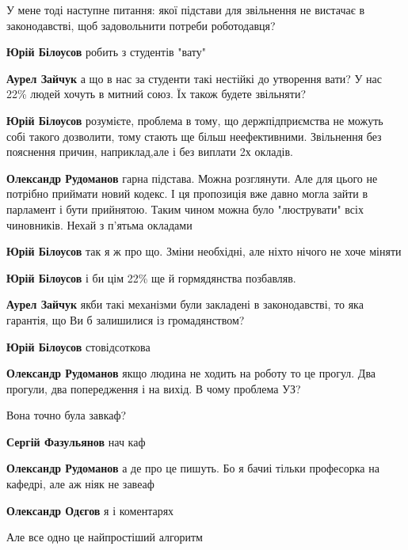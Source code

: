 \begin{itemize}
\begin{itemize}
У мене тоді наступне питання: якої підстави для звільнення не вистачає в
законодавстві, щоб задовольнити потреби роботодавця?

\textbf{Юрій Білоусов} робить з студентів "вату"

\textbf{Аурел Зайчук} а що в нас за студенти такі нестійкі до утворення вати? У нас 22\% людей хочуть в митний союз. Їх також будете звільняти?


\textbf{Юрій Білоусов} розумієте, проблема в тому, що держпідприємства не можуть собі такого дозволити, тому стають ще більш неефективними.
Звільнення без пояснення причин, наприклад,але і без виплати 2х окладів.

\textbf{Олександр Рудоманов} гарна підстава. Можна розглянути. Але для цього не потрібно приймати новий кодекс. І ця пропозиція вже давно могла зайти в парламент і бути прийнятою. Таким чином можна було "люструвати" всіх чиновників. Нехай з п'ятьма окладами


\textbf{Юрій Білоусов} так я ж про що. Зміни необхідні, але ніхто нічого не хоче міняти

\textbf{Юрій Білоусов} і би цім 22\% ще й гормядянства позбавляв.

\textbf{Аурел Зайчук} якби такі механізми були закладені в законодавстві, то яка гарантія, що Ви б залишилися із громадянством?

\textbf{Юрій Білоусов} стовідсоткова

\textbf{Олександр Рудоманов} якщо людина не ходить на роботу то це прогул. Два прогули, два попередження і на вихід. В чому проблема УЗ?

\end{itemize} %

Вона точно була завкаф?

\begin{itemize} %

\textbf{Сергій Фазульянов} нач каф

\textbf{Олександр Рудоманов} а де про це пишуть. Бо я бачиі тільки професорка на кафедрі, але аж ніяк не завеаф


\textbf{Олександр Одєгов} я і коментарях


Але все одно це найпростіший алгоритм


\end{itemize}
\end{itemize}
